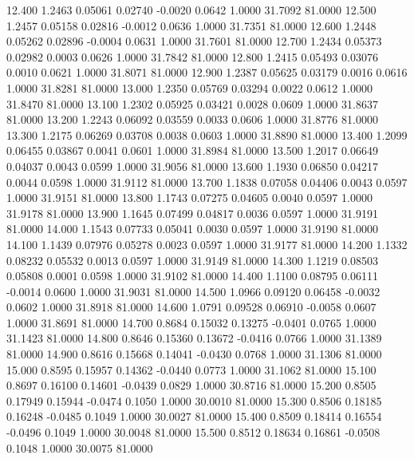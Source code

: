   12.400   1.2463   0.05061   0.02740  -0.0020   0.0642   1.0000  31.7092  81.0000
  12.500   1.2457   0.05158   0.02816  -0.0012   0.0636   1.0000  31.7351  81.0000
  12.600   1.2448   0.05262   0.02896  -0.0004   0.0631   1.0000  31.7601  81.0000
  12.700   1.2434   0.05373   0.02982   0.0003   0.0626   1.0000  31.7842  81.0000
  12.800   1.2415   0.05493   0.03076   0.0010   0.0621   1.0000  31.8071  81.0000
  12.900   1.2387   0.05625   0.03179   0.0016   0.0616   1.0000  31.8281  81.0000
  13.000   1.2350   0.05769   0.03294   0.0022   0.0612   1.0000  31.8470  81.0000
  13.100   1.2302   0.05925   0.03421   0.0028   0.0609   1.0000  31.8637  81.0000
  13.200   1.2243   0.06092   0.03559   0.0033   0.0606   1.0000  31.8776  81.0000
  13.300   1.2175   0.06269   0.03708   0.0038   0.0603   1.0000  31.8890  81.0000
  13.400   1.2099   0.06455   0.03867   0.0041   0.0601   1.0000  31.8984  81.0000
  13.500   1.2017   0.06649   0.04037   0.0043   0.0599   1.0000  31.9056  81.0000
  13.600   1.1930   0.06850   0.04217   0.0044   0.0598   1.0000  31.9112  81.0000
  13.700   1.1838   0.07058   0.04406   0.0043   0.0597   1.0000  31.9151  81.0000
  13.800   1.1743   0.07275   0.04605   0.0040   0.0597   1.0000  31.9178  81.0000
  13.900   1.1645   0.07499   0.04817   0.0036   0.0597   1.0000  31.9191  81.0000
  14.000   1.1543   0.07733   0.05041   0.0030   0.0597   1.0000  31.9190  81.0000
  14.100   1.1439   0.07976   0.05278   0.0023   0.0597   1.0000  31.9177  81.0000
  14.200   1.1332   0.08232   0.05532   0.0013   0.0597   1.0000  31.9149  81.0000
  14.300   1.1219   0.08503   0.05808   0.0001   0.0598   1.0000  31.9102  81.0000
  14.400   1.1100   0.08795   0.06111  -0.0014   0.0600   1.0000  31.9031  81.0000
  14.500   1.0966   0.09120   0.06458  -0.0032   0.0602   1.0000  31.8918  81.0000
  14.600   1.0791   0.09528   0.06910  -0.0058   0.0607   1.0000  31.8691  81.0000
  14.700   0.8684   0.15032   0.13275  -0.0401   0.0765   1.0000  31.1423  81.0000
  14.800   0.8646   0.15360   0.13672  -0.0416   0.0766   1.0000  31.1389  81.0000
  14.900   0.8616   0.15668   0.14041  -0.0430   0.0768   1.0000  31.1306  81.0000
  15.000   0.8595   0.15957   0.14362  -0.0440   0.0773   1.0000  31.1062  81.0000
  15.100   0.8697   0.16100   0.14601  -0.0439   0.0829   1.0000  30.8716  81.0000
  15.200   0.8505   0.17949   0.15944  -0.0474   0.1050   1.0000  30.0010  81.0000
  15.300   0.8506   0.18185   0.16248  -0.0485   0.1049   1.0000  30.0027  81.0000
  15.400   0.8509   0.18414   0.16554  -0.0496   0.1049   1.0000  30.0048  81.0000
  15.500   0.8512   0.18634   0.16861  -0.0508   0.1048   1.0000  30.0075  81.0000
